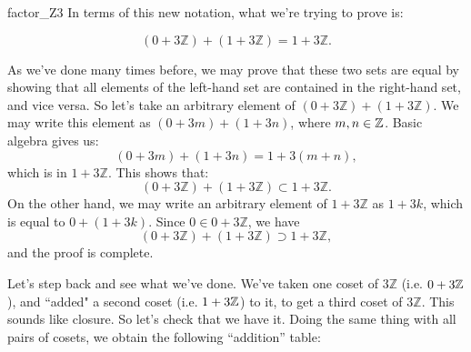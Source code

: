 {\begin{example}{factor_Z3}
In terms of this new notation, what we're trying to prove is:

\[ (0 + 3 {\mathbb Z}) + (1 + 3 {\mathbb Z}) = 1 + 3 {\mathbb Z}. \]

As we've done many times before, we may prove that these two sets are equal by showing that all elements of the left-hand set are contained in the right-hand set, and vice versa. So let's take an arbitrary element of $(0 + 3 {\mathbb Z}) + (1 + 3 {\mathbb Z})$. We may write this element as $(0 + 3m) + (1 + 3n)$, where $m,n \in \mathbb{Z}$. Basic algebra gives us:
\[(0 + 3m) + (1 + 3 n) = 1 + 3(m+ n), \]
which is in $1 + 3 {\mathbb Z}$. This shows that: 
\[ (0 + 3 {\mathbb Z}) + (1 + 3 {\mathbb Z}) \subset 1 + 3 {\mathbb Z}. \]
On the other hand, we may write an arbitrary element of $1 + 3 {\mathbb Z}$ as $1 + 3k$, which is equal to  $0 + (1 + 3k)$.  Since $0 \in 0 + 3 {\mathbb Z}$, we have 
\[ (0 + 3 {\mathbb Z}) + (1 + 3 {\mathbb Z}) \supset 1 + 3 {\mathbb Z}, \]
and the proof is complete.

%
%
%
%
%

Let's step back and see what we've done. We've taken one coset of $ 3 {\mathbb Z}$ (i.e. $0 + 3\mathbb{Z}$), and ``added" a second coset (i.e. $1 + 3\mathbb{Z}$) to it, to get a third coset of $ 3 {\mathbb Z}$. This sounds like closure.  So let's check that we have it.  Doing the same thing with all pairs of cosets, we obtain the following ``addition'' table: 


\end{example}}
